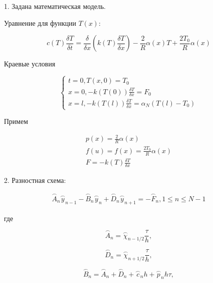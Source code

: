 \documentclass[a4paper,14pt]{article}
\begin{document}
1. Задана математическая модель.

Уравнение для функции $T(x)$:

\begin{equation}
	c(T) \frac{\delta T}{\delta t} = \frac{\delta}{\delta x} \left( k(T) \frac{\delta T}{\delta x} \right) - \frac{2}{R} \alpha (x) T + \frac{2 T_0}{R} \alpha(x)
\end{equation}

Краевые условия

\begin{equation}
	\begin{cases}
		t = 0, T(x, 0) = T_0 \\
		x = 0, -k(T(0)) \frac{\delta T}{\delta x} = F_0 \\
		x = l, -k(T(l)) \frac{\delta T}{\delta x} = \alpha_N (T(l) - T_0)
  	\end{cases}
\end{equation}

Примем

\begin{eqnarray}
	p(x) = \frac{2}{R} \alpha(x) \\
	f(u) = f(x) = \frac{2 T_0}{R} \alpha(x) \\
	F = -k(T) \frac{\delta T}{\delta x}
\end{eqnarray}

2. Разностная схема:

\begin{eqnarray}
	\stackrel{\frown}{A}_n \stackrel{\frown}{y}_{n-1} - \stackrel{\frown}{B}_n \stackrel{\frown}{y}_n + \stackrel{\frown}{D}_n \stackrel{\frown}{y}_{n+1} = - \stackrel{\frown}{F}_n, 1 \leq n \leq N - 1
\end{eqnarray}

где

\begin{equation}
	\stackrel{\frown}{A}_n = \stackrel{\frown}{\chi}_{n-1/2} \frac{\tau}{h}, 
\end{equation}

\begin{equation}
	\stackrel{\frown}{D}_n = \stackrel{\frown}{\chi}_{n+1/2} \frac{\tau}{h},
\end{equation}

\begin{equation}
	\stackrel{\frown}{B}_n = \stackrel{\frown}{A}_n + \stackrel{\frown}{D}_n + \stackrel{\frown}{c}_n h + \stackrel{\frown}{p}_n h \tau,
\end{equation}
\end{document}
